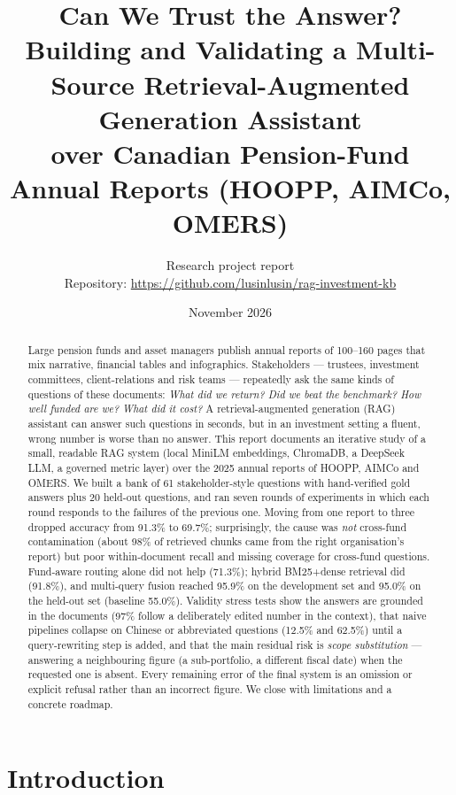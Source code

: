 \documentclass[11pt,a4paper]{article}
\title{\textbf{Can We Trust the Answer?}\\[4pt]
\large Building and Validating a Multi-Source Retrieval-Augmented Generation Assistant\\
over Canadian Pension-Fund Annual Reports (HOOPP, AIMCo, OMERS)}
\author{Research project report \\ \small Repository: \url{https://github.com/lusinlusin/rag-investment-kb}}
\date{November 2026}
\begin{document}
\maketitle

\begin{abstract}
\noindent
Large pension funds and asset managers publish annual reports of 100--160 pages that mix narrative,
financial tables and infographics. Stakeholders --- trustees, investment committees, client-relations and
risk teams --- repeatedly ask the same kinds of questions of these documents: \emph{What did we return? Did we beat
the benchmark? How well funded are we? What did it cost?} A retrieval-augmented generation (RAG) assistant can
answer such questions in seconds, but in an investment setting a fluent, wrong number is worse than no answer.
This report documents an iterative study of a small, readable RAG system (local MiniLM embeddings, ChromaDB,
a DeepSeek LLM, a governed metric layer) over the 2025 annual reports of HOOPP, AIMCo and OMERS. We built a bank of
61 stakeholder-style questions with hand-verified gold answers plus 20 held-out questions, and ran seven rounds of
experiments in which each round responds to the failures of the previous one. Moving from one report to three
dropped accuracy from 91.3\% to 69.7\%; surprisingly, the cause was \emph{not} cross-fund contamination (about 98\% of
retrieved chunks came from the right organisation's report) but poor within-document recall and missing coverage for cross-fund questions.
Fund-aware routing alone did not help (71.3\%); hybrid BM25+dense retrieval did (91.8\%), and multi-query fusion
reached 95.9\% on the development set and 95.0\% on the held-out set (baseline 55.0\%). Validity stress tests show the
answers are grounded in the documents (97\% follow a deliberately edited number in the context), that naive
pipelines collapse on Chinese or abbreviated questions (12.5\% and 62.5\%) until a query-rewriting step is added,
and that the main residual risk is \emph{scope substitution} --- answering a neighbouring figure (a sub-portfolio, a
different fiscal date) when the requested one is absent. Every remaining error of the final system is an omission
or explicit refusal rather than an incorrect figure. We close with limitations and a concrete roadmap.
\end{abstract}

\tableofcontents
\newpage

\section{Introduction}
\label{sec:intro}
\end{document}
